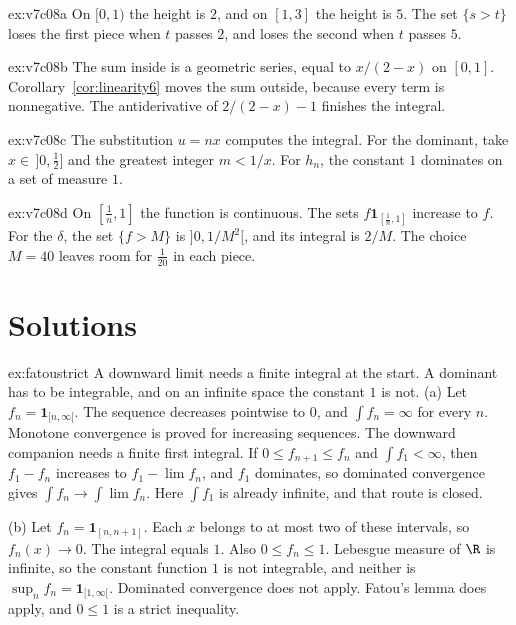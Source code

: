 \begin{hint}{ex:v7c08a}
On \([0,1)\) the height is \(2\), and on \([1,3]\) the height is \(5\). The set \(\{s>t\}\) loses the first piece when \(t\) passes \(2\), and loses the second when \(t\) passes \(5\).
\end{hint}
\begin{hint}{ex:v7c08b}
The sum inside is a geometric series, equal to \(x/(2-x)\) on \([0,1]\). Corollary~\ref{cor:linearity6} moves the sum outside, because every term is nonnegative. The antiderivative of \(2/(2-x)-1\) finishes the integral.
\end{hint}
\begin{hint}{ex:v7c08c}
The substitution \(u=nx\) computes the integral. For the dominant, take \(x\in\,]0,\frac12]\) and the greatest integer \(m<1/x\). For \(h_n\), the constant \(1\) dominates on a set of measure \(1\).
\end{hint}
\begin{hint}{ex:v7c08d}
On \([\frac1n,1]\) the function is continuous. The sets \(f\mathbf 1_{[\frac1n,1]}\) increase to \(f\). For the \(\delta\), the set \(\{f>M\}\) is \(]0,1/M^2[\), and its integral is \(2/M\). The choice \(M=40\) leaves room for \(\frac1{20}\) in each piece.
\end{hint}

\section{Solutions}

\begin{solution}{ex:fatoustrict}
\idea A downward limit needs a finite integral at the start. A dominant has to be integrable, and on an infinite space the constant \(1\) is not.
\writeup (a) Let \(f_n=\mathbf 1_{[n,\infty[}\). The sequence decreases pointwise to \(0\), and \(\int f_n=\infty\) for every \(n\). Monotone convergence is proved for increasing sequences. The downward companion needs a finite first integral. If \(0\le f_{n+1}\le f_n\) and \(\int f_1<\infty\), then \(f_1-f_n\) increases to \(f_1-\lim f_n\), and \(f_1\) dominates, so dominated convergence gives \(\int f_n\to\int\lim f_n\). Here \(\int f_1\) is already infinite, and that route is closed.

(b) Let \(f_n=\mathbf 1_{[n,n+1]}\). Each \(x\) belongs to at most two of these intervals, so \(f_n(x)\to0\). The integral equals \(1\). Also \(0\le f_n\le1\). Lebesgue measure of \(\R\) is infinite, so the constant function \(1\) is not integrable, and neither is \(\sup_nf_n=\mathbf 1_{[1,\infty[}\). Dominated convergence does not apply. Fatou's lemma does apply, and \(0\le1\) is a strict inequality.
\end{solution}

